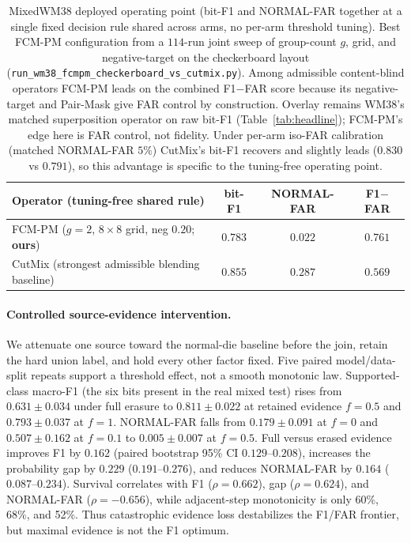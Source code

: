 \documentclass[11pt]{article}
\begin{document}
\begin{table}[t]
\centering
\caption{MixedWM38 deployed operating point (bit-F1 and NORMAL-FAR together at a single
fixed decision rule shared across arms, no per-arm threshold tuning). Best FCM-PM
configuration from a $114$-run joint sweep of group-count $g$, grid, and negative-target
on the checkerboard layout (\texttt{run\_wm38\_fcmpm\_checkerboard\_vs\_cutmix.py}). Among
admissible content-blind operators FCM-PM leads on the combined F1$-$FAR score because its
negative-target and Pair-Mask give FAR control by construction. Overlay remains WM38's
matched superposition operator on raw bit-F1 (Table~\ref{tab:headline}); FCM-PM's edge
here is FAR control, not fidelity. Under per-arm iso-FAR calibration (matched NORMAL-FAR
$5\%$) CutMix's bit-F1 recovers and slightly leads ($0.830$ vs $0.791$), so this advantage
is specific to the tuning-free operating point.}
\label{tab:wm38deploy}
\begin{tabular}{lccc}
\toprule
Operator (tuning-free shared rule) & bit-F1 & NORMAL-FAR & F1$-$FAR \\
\midrule
FCM-PM ($g{=}2$, $8{\times}8$ grid, neg $0.20$; \textbf{ours}) & $0.783$ & $\mathbf{0.022}$ & $\mathbf{0.761}$ \\
CutMix (strongest admissible blending baseline)               & $\mathbf{0.855}$ & $0.287$ & $0.569$ \\
\bottomrule
\end{tabular}
\end{table}

\paragraph{Controlled source-evidence intervention.}
We attenuate one source toward the normal-die baseline before the join,
retain the hard union label, and hold every other factor fixed. Five paired
model/data-split repeats support a threshold effect, not a smooth monotonic
law. Supported-class macro-F1 (the six bits present in the real mixed test)
rises from $0.631\pm0.034$ under full erasure to $0.811\pm0.022$ at retained
evidence $f{=}0.5$ and $0.793\pm0.037$ at $f{=}1$. NORMAL-FAR falls from
$0.179\pm0.091$ at $f{=}0$ and $0.507\pm0.162$ at $f{=}0.1$ to
$0.005\pm0.007$ at $f{=}0.5$. Full versus erased evidence improves F1 by
$0.162$ (paired bootstrap 95\% CI $0.129$--$0.208$), increases the probability
gap by $0.229$ ($0.191$--$0.276$), and reduces NORMAL-FAR by $0.164$
($0.087$--$0.234$). Survival correlates with F1 ($\rho{=}0.662$), gap
($\rho{=}0.624$), and NORMAL-FAR ($\rho{=}-0.656$), while adjacent-step
monotonicity is only 60\%, 68\%, and 52\%. Thus catastrophic evidence loss
destabilizes the F1/FAR frontier, but maximal evidence is not the F1 optimum.
\end{document}
